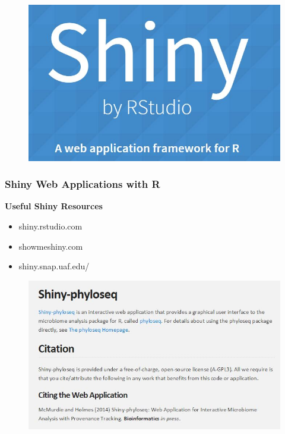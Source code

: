 \documentclass[compress]{beamer}        %
\begin{document}
\begin{frame}
	\begin{figure}
\centering
\includegraphics[width=0.99\linewidth]{SHINY}
\end{figure}

\end{frame}

\begin{frame}
\frametitle{Shiny Web Applications with R}
\Large
\textbf{Useful Shiny Resources}
\bigskip
\begin{itemize}
\item  shiny.rstudio.com \bigskip
\item  showmeshiny.com \bigskip
\item  shiny.snap.uaf.edu/ \bigskip
\end{itemize}
\end{frame}
\begin{frame}
	\begin{figure}
		\centering
		\includegraphics[width=0.99\linewidth]{SHINYCITE}
	\end{figure}
	
\end{frame}
\end{document}
